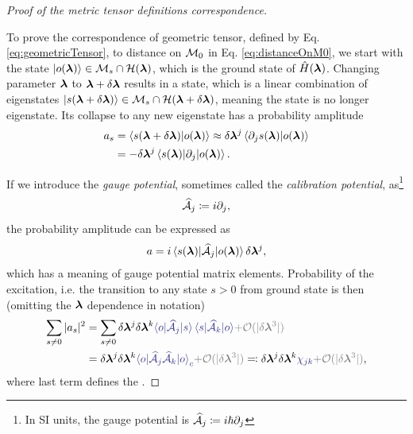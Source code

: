 \begin{proof}[Proof of the  metric tensor definitions correspondence]\
    \label{sec:derivationOfGeometricTensor}

    To prove the correspondence of geometric tensor, defined by Eq. \ref{eq:geometricTensor}, to distance on $\M_0$ in Eq. \ref{eq:distanceOnM0}, we start with the state $\ket{o(\llambda)}\in \M_s\cap\H(\llambda)$, which is the ground state of $\HH(\llambda)$. Changing parameter $\llambda$ to $\llambda+\delta \llambda$ results in a state, which is a linear combination of eigenstates $\ket{s(\llambda+\delta \llambda)}\in \M_s\cap\H(\llambda+\delta \llambda)$, meaning the state is no longer eigenstate. Its collapse to any new eigenstate has a probability amplitude
    \begin{equation}
        \begin{split}
            a_s&=\braket{s(\llambda+\delta\llambda)|o(\llambda)}\approx \delta\llambda^j\braket{\partial_j s(\llambda)|o(\llambda)} \\
            &= -\delta\llambda^j\braket{s(\llambda)|\partial_j|o(\llambda)}.
        \end{split}
    \end{equation}

    If we introduce the \emph{gauge potential}, sometimes called the \emph {calibration potential}, as\footnote{In SI units, the gauge potential is $\AA_j\coloneqq i\hbar\partial_{j}$}
    \begin{equation}
        \AA_j\coloneqq i\partial_{j},
    \end{equation}
    the probability amplitude can be expressed as
    \begin{equation}
    a=i\braket{s(\llambda)|\AA_j |o(\llambda)}\delta\llambda^j,
    \label{eq:probabilityOfTransitionIsGauge}
    \end{equation}
    which has a meaning of gauge potential matrix elements. Probability of the excitation, i.e. the transition to any state $s>0$ from ground state is then (omitting the $\llambda$ dependence in notation)
    \begin{equation}
        \begin{split}
            \sum_{s\neq 0}|a_s|^2&=  \sum_{s\neq 0} \delta \llambda^j \delta \llambda^k\bluee{\braket{o|\AA_j|s}\braket{s|\AA_k|o}}\gray{+\O(|\delta \llambda^3|)} \\
            &= \delta \llambda^j \delta \llambda^k\bluee{\braket{o|\AA_j \AA_k|o}_c}\gray{+\O(|\delta \llambda^3|)}\eqqcolon \delta \llambda^j \delta \llambda^k\bluee{\chi_{jk}}\gray{+\O(|\delta \llambda^3|)},
        \end{split}
    \end{equation}
    where last term defines the .
\end{proof}






